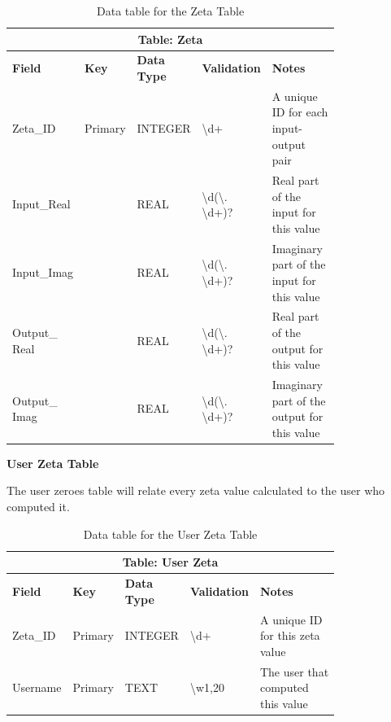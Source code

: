 \documentclass{article}
\begin{document}
\begin{table}[ht]
    \centering
    \begin{tabular}{ | p{0.15\linewidth} | p{0.1\linewidth} | p{0.16\linewidth} | p{0.14\linewidth} | p{0.25\linewidth} | }
    \hline
    \multicolumn{5}{|c|}{\textbf{Table: Zeta}}\\
    \hline
    \hline
    \textbf{Field} & \textbf{Key} & \textbf{Data Type} & \textbf{Validation} & \textbf{Notes} \\
    \hline
    Zeta\_ID & Primary & INTEGER & \textbackslash d+ & A unique ID for each input-output pair\\
    \hline
    Input\_Real & & REAL & \textbackslash d(\textbackslash. \textbackslash d+)? & Real part of the input for this value\\
    \hline
    Input\_Imag & & REAL & \textbackslash d(\textbackslash. \textbackslash d+)? & Imaginary part of the input for this value\\
    \hline
    Output\_ Real & & REAL & \textbackslash d(\textbackslash. \textbackslash d+)? & Real part of the output for this value\\
    \hline
    Output\_ Imag & & REAL & \textbackslash d(\textbackslash. \textbackslash d+)? & Imaginary part of the output for this value\\
    \hline
    \end{tabular}
    \caption{Data table for the Zeta Table}
\end{table}

\clearpage
\textbf{User Zeta Table}

The user zeroes table will relate every  zeta value calculated to the user who computed it.

\begin{table}[ht]
    \centering
    \begin{tabular}{ | p{0.15\linewidth} | p{0.1\linewidth} | p{0.16\linewidth} | p{0.14\linewidth} | p{0.25\linewidth} | }
    \hline
    \multicolumn{5}{|c|}{\textbf{Table: User Zeta}}\\
    \hline
    \hline
    \textbf{Field} & \textbf{Key} & \textbf{Data Type} & \textbf{Validation} & \textbf{Notes} \\
    \hline
    Zeta\_ID & Primary & INTEGER & \textbackslash d+ & A unique ID for this zeta value\\
    \hline
    Username & Primary & TEXT & \textbackslash w{1,20}& The user that computed this value\\
    \hline
    \end{tabular}
    \caption{Data table for the User Zeta Table}
\end{table}
\end{document}
